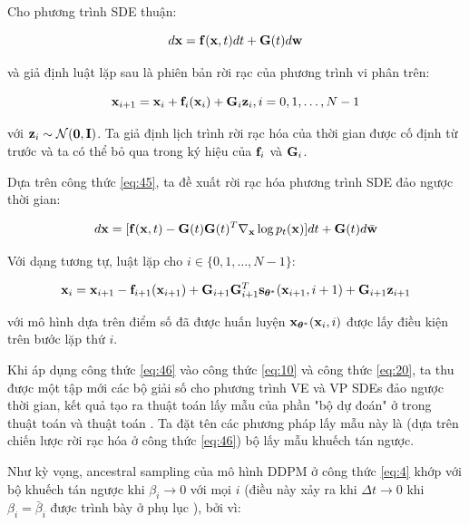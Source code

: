 \documentclass{article} %
\begin{document}
Cho phương trình SDE thuận:

\begin{equation*}
    d \bold{x} = \bold{f}(\bold{x}, t) dt + \bold{G}(t) d \bold{w}
\end{equation*}

và giả định luật lặp sau là phiên bản rời rạc của phương trình vi phân trên:

\begin{equation} \label{eq:45}
    \bold{x}_{i+1} = \bold{x}_i + \bold{f}_i (\bold{x}_i) + \bold{G}_i \bold{z}_i, i = 0, 1, \dots, N - 1
\end{equation}

với $\bold{z}_i \sim \mathcal{N}(\bold{0}, \bold{I})$.
Ta giả định lịch trình rời rạc hóa của thời gian được cố định từ trước và ta có thể bỏ qua trong ký hiệu của $\bold{f}_i$ và $\bold{G}_i$.

Dựa trên công thức \ref{eq:45}, ta đề xuất rời rạc hóa phương trình SDE đảo ngược thời gian:

\begin{equation*}
    d \bold{x} = \lbrack \bold{f}(\bold{x}, t) - \bold{G}(t) \bold{G}(t)^T \nabla_{\bold{x}} \log p_t (\bold{x}) \rbrack dt + \bold{G}(t) d \bar{\bold{w}}
\end{equation*}

Với dạng tương tự, luật lặp cho $i \in \lbrace 0, 1, \dots, N -1 \rbrace$:

\begin{equation} \label{eq:46}
    \bold{x}_i = \bold{x}_{i+1} - \bold{f}_{i+1} (\bold{x}_{i+1}) + \bold{G}_{i+1} \bold{G}_{i+1}^T \bold{s}_{\boldsymbol{\theta}^{\ast}} (\bold{x}_{i+1}, i + 1) + \bold{G}_{i+1} \bold{z}_{i+1}
\end{equation}

với mô hình dựa trên điểm số đã được huấn luyện $\bold{x}_{\boldsymbol{\theta}^{\ast}}(\bold{x}_i, i)$ được lấy điều kiện trên bước lặp thứ $i$.

Khi áp dụng công thức \ref{eq:46} vào công thức \ref{eq:10} và công thức \ref{eq:20}, ta thu được một tập mới các bộ giải số cho phương trình VE và VP SDEs đảo ngược thời gian, kết quả tạo ra thuật toán lấy mẫu của phần "bộ dự đoán" ở trong thuật toán và thuật toán .
Ta đặt tên các phương pháp lấy mẫu này là (dựa trên chiến lược rời rạc hóa ở công thức \ref{eq:46}) bộ lấy mẫu khuếch tán ngược.

Như kỳ vọng, ancestral sampling của mô hình DDPM \citep{ho2020denoising} ở công thức \ref{eq:4} khớp với bộ khuếch tán ngược khi $\beta_i \rightarrow 0$ với mọi $i$ (điều này xảy ra khi $\Delta t \rightarrow 0$ khi $\beta_i = \bar{\beta}_i$ được trình bày ở phụ lục ), bởi vì:
\end{document}
